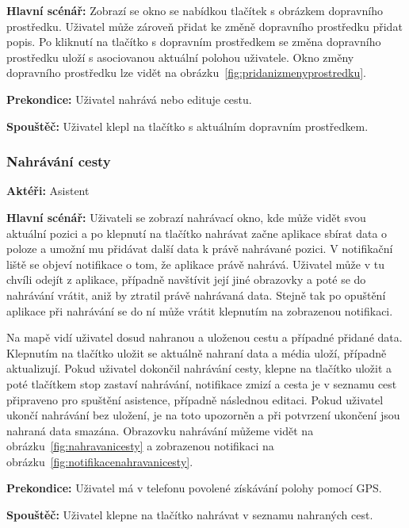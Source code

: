 \documentclass{article}
\newcommand{\usecase}[2]{\subsubsection{#1}\label{#2}}
\begin{document}
\vspace{0.1cm}
\noindent
\textbf{Hlavní scénář:} Zobrazí se okno se nabídkou tlačítek s obrázkem dopravního prostředku.
Uživatel může zároveň přidat ke změně dopravního prostředku přidat popis. Po kliknutí na
tlačítko s dopravním prostředkem se změna dopravního prostředku uloží s asociovanou aktuální polohou
uživatele. Okno změny dopravního prostředku lze vidět na obrázku~\ref{fig:pridanizmenyprostredku}.

\vspace{0.1cm}
\noindent
\textbf{Prekondice:} Uživatel nahrává nebo edituje cestu.

\vspace{0.1cm}
\noindent
\textbf{Spouštěč:} Uživatel klepl na tlačítko s aktuálním dopravním prostředkem.




\usecase{Nahrávání cesty}{nahravanicesty}
\textbf{Aktéři:} Asistent

\vspace{0.1cm}
\noindent
\textbf{Hlavní scénář:} Uživateli se zobrazí nahrávací okno, kde může vidět svou aktuální pozici
a po klepnutí na tlačítko nahrávat začne aplikace sbírat data o poloze a umožní mu přidávat další data
k právě nahrávané pozici. V notifikační liště se objeví notifikace o tom, že aplikace právě nahrává.
Uživatel může v tu chvíli odejít z aplikace, případně navštívit její jiné obrazovky a poté se do nahrávání vrátit,
aniž by ztratil právě nahrávaná data. Stejně tak po opuštění aplikace při nahrávání se do ní může vrátit
klepnutím na zobrazenou notifikaci.

Na mapě vidí uživatel dosud nahranou a uloženou cestu a případné přidané data.
Klepnutím na tlačítko uložit se aktuálně nahraní data a média uloží, případně aktualizují.
Pokud uživatel dokončil nahrávání cesty, klepne na tlačítko uložit a poté tlačítkem stop zastaví nahrávání,
notifikace zmizí a cesta je v seznamu cest připraveno pro spuštění asistence, případně následnou editaci.
Pokud uživatel ukončí nahrávání bez uložení, je na toto upozorněn a při potvrzení ukončení jsou nahraná data
smazána. Obrazovku nahrávání můžeme vidět na obrázku~\ref{fig:nahravanicesty} a zobrazenou notifikaci
na obrázku~\ref{fig:notifikacenahravanicesty}.

\vspace{0.1cm}
\noindent
\textbf{Prekondice:} Uživatel má v telefonu povolené získávání polohy pomocí GPS.

\vspace{0.1cm}
\noindent
\textbf{Spouštěč:} Uživatel klepne na tlačítko nahrávat v seznamu nahraných cest.
\end{document}
